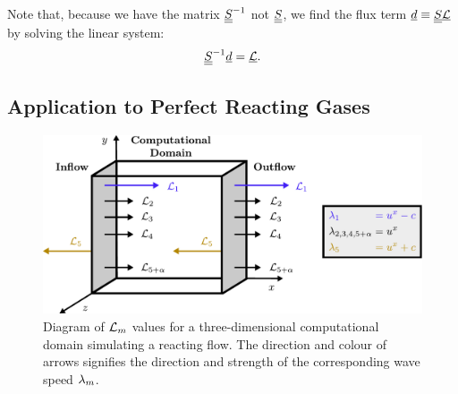 Note that, because we have the matrix $\underline{\underline{S}}^{-1}$ not $\underline{\underline{S}}$, we find the flux term $\underline{d} \equiv \underline{\underline{S}}\underline{\mathcal{L}}$ by solving the linear system:
\begin{equation}
\underline{\underline{S}}^{-1} \underline{d} = \underline{\mathcal{L}}.
\end{equation}




\subsection{Application to Perfect Reacting Gases}

\begin{figure}[t]
\centering
\includegraphics[scale=0.6]{assets/imgs/NSCBC-L.pdf}
\caption{Diagram of $\mathcal{L}_m$ values for a three-dimensional computational domain simulating a reacting flow. The direction and colour of arrows signifies the direction and strength of the corresponding wave speed $\lambda_m$.}
\label{fig:NSCBC}
\end{figure}

